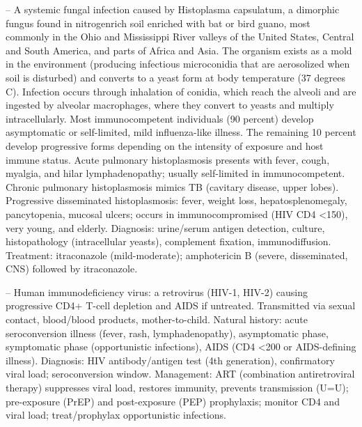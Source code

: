 -- A systemic fungal infection caused by Histoplasma capsulatum, a dimorphic fungus found in nitrogenrich soil enriched with bat or bird guano, most commonly in the Ohio and Mississippi River valleys of the United States, Central and South America, and parts of Africa and Asia. The organism exists as a mold in the environment (producing infectious microconidia that are aerosolized when soil is disturbed) and converts to a yeast form at body temperature (37 degrees C). Infection occurs through inhalation of conidia, which reach the alveoli and are ingested by alveolar macrophages, where they convert to yeasts and multiply intracellularly. Most immunocompetent individuals (90 percent) develop asymptomatic or self-limited, mild influenza-like illness. The remaining 10 percent develop progressive forms depending on the intensity of exposure and host immune status. Acute pulmonary histoplasmosis presents with fever, cough, myalgia, and hilar lymphadenopathy; usually self-limited in immunocompetent. Chronic pulmonary histoplasmosis mimics TB (cavitary disease, upper lobes). Progressive disseminated histoplasmosis: fever, weight loss, hepatosplenomegaly, pancytopenia, mucosal ulcers; occurs in immunocompromised (HIV CD4 <150), very young, and elderly. Diagnosis: urine/serum antigen detection, culture, histopathology (intracellular yeasts), complement fixation, immunodiffusion. Treatment: itraconazole (mild-moderate); amphotericin B (severe, disseminated, CNS) followed by itraconazole.

-- Human immunodeficiency virus: a retrovirus (HIV-1, HIV-2) causing progressive CD4+ T-cell depletion and AIDS if untreated. Transmitted via sexual contact, blood/blood products, mother-to-child. Natural history: acute seroconversion illness (fever, rash, lymphadenopathy), asymptomatic phase, symptomatic phase (opportunistic infections), AIDS (CD4 <200 or AIDS-defining illness). Diagnosis: HIV antibody/antigen test (4th generation), confirmatory viral load; seroconversion window. Management: ART (combination antiretroviral therapy) suppresses viral load, restores immunity, prevents transmission (U=U); pre-exposure (PrEP) and post-exposure (PEP) prophylaxis; monitor CD4 and viral load; treat/prophylax opportunistic infections.

